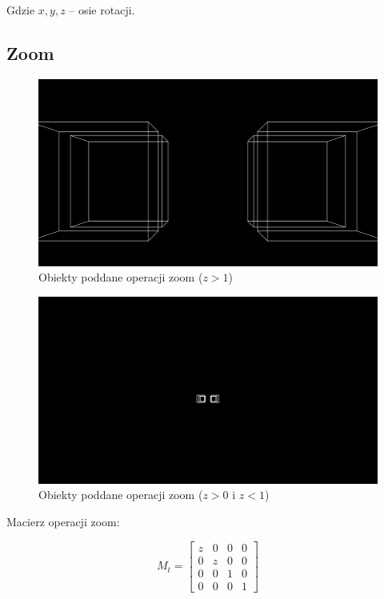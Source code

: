 \documentclass{article}
\begin{document}
        Gdzie \(x, y, z\) -- osie rotacji.

    \subsection{Zoom}

        \begin{figure}
            \includegraphics[width=\textwidth]{zoom_in}
            \caption{Obiekty poddane operacji zoom (\(z > 1\))}
            \centering
        \end{figure}

        \begin{figure}
            \includegraphics[width=\textwidth]{zoom_out}
            \caption{Obiekty poddane operacji zoom (\(z > 0\) i \(z < 1\))}
            \centering
        \end{figure}

        Macierz operacji zoom:

        \begin{equation}
            M_t=
            \begin{bmatrix}
                z & 0 & 0 & 0 \\
                0 & z & 0 & 0 \\
                0 & 0 & 1 & 0 \\
                0 & 0 &0 & 1
            \end{bmatrix}
        \end{equation}
\end{document}
